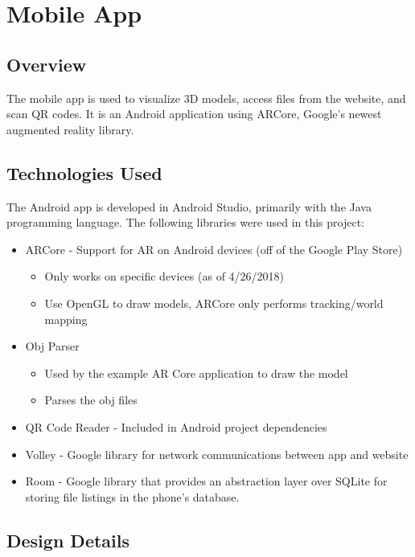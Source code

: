 
\section{Mobile App}

    \subsection{Overview}
The mobile app is used to visualize 3D models, access files from the website, and scan QR codes. It is an Android application using ARCore, Google's newest augmented reality library.
    \subsection{Technologies Used}
The Android app is developed in Android Studio, primarily with the Java programming language. The following libraries were used in this project:
    \begin{itemize}
        \item ARCore - Support for AR on Android devices (off of the Google Play Store)
        \begin{itemize}
            \item Only works on specific devices (as of 4/26/2018)
            \item Use OpenGL to draw models, ARCore only performs tracking/world mapping
        \end{itemize}
        \item Obj Parser
        \begin{itemize}
            \item Used by the example AR Core application to draw the model
            \item Parses the obj files
        \end{itemize}
        \item QR Code Reader - Included in Android project dependencies
        \item Volley - Google library for network communications between app and website
        \item Room - Google library that provides an abstraction layer over SQLite for storing file listings in the phone's database.
    \end{itemize}

    \subsection{Design Details}
    
